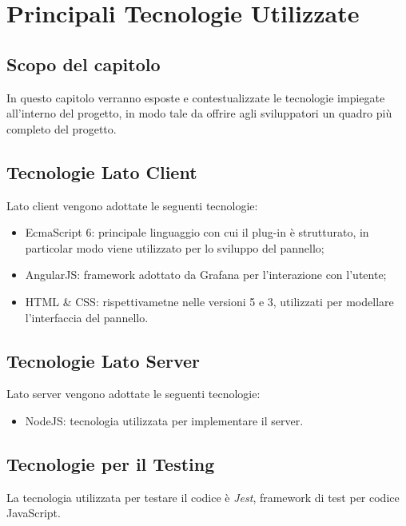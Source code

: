 \section{Principali Tecnologie Utilizzate}\label{tecnologie}
\subsection{Scopo del capitolo}
In questo capitolo verranno esposte e contestualizzate le tecnologie impiegate all'interno del progetto, in modo tale da offrire agli sviluppatori un quadro più completo del progetto.

\subsection{Tecnologie Lato Client}\label{clientTec}
Lato client vengono adottate le seguenti tecnologie:
\begin{itemize}
	\item EcmaScript 6: principale linguaggio con cui il plug-in è strutturato, in particolar modo viene utilizzato per lo sviluppo del pannello;
	\item AngularJS: framework adottato da Grafana per l'interazione con l'utente;
	\item HTML \& CSS: rispettivametne nelle versioni 5 e 3, utilizzati per modellare l'interfaccia del pannello.
\end{itemize}

\subsection{Tecnologie Lato Server}\label{serverTec}
Lato server vengono adottate le seguenti tecnologie:
\begin{itemize}
	\item NodeJS: tecnologia utilizzata per implementare il server.
\end{itemize}

\subsection{Tecnologie per il Testing}\label{testTec}
La tecnologia utilizzata per testare il codice è \textit{Jest}, framework di test per codice JavaScript.